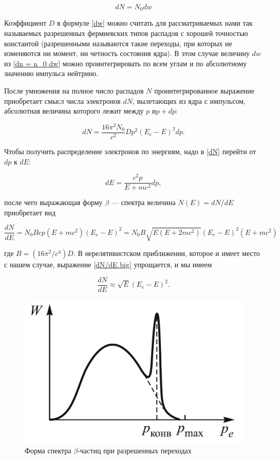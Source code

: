 \documentclass[12pt]{kiarticle} %
\newcommand{\be}{\ensuremath{\beta}}
\begin{document}
\begin{equation}\label{dn = n_0 dw}
dN = N_0 dw  
\end{equation}

Коэффициент $ D $ в формуле \eqref{dw} можно считать для рассматриваемых нами так называемых разрешенных фермиевских типов распадов с хорошей точностью константой (разрешенными называются такие переходы, при которых не изменяются ни момент, ни четность состояния ядра). В этом случае величину $ dw $ из \eqref{dn = n_0 dw} можно проинтегрировать по всем углам и по абсолютному значению импульса нейтрино.

После умножения на полное число распадов $ N $ проинтегрированное выражение приобретает смысл числа электронов $ dN $, вылетающих из ядра с импульсом, абсолютная величина которого лежит между $ p $ и$  p + dp $:

\begin{equation}\label{dN}
dN = \dfrac{16\pi^2 N_0}{c^2}Dp^2(E_e - E)^2dp.
\end{equation}

Чтобы получить распределение электронов по энергиям, надо в \eqref{dN} перейти от $ dp $ к $ dE $:

\begin{equation}
dE = \dfrac{c^2p}{E + mc^2}dp,
\end{equation}

после чего выражающая форму $\beta$ --- спектра величина $ N(E) = dN/dE $
приобретает вид

\begin{equation}\label{dN/dE big}
\dfrac{dN}{dE} = N_0Bcp(E + mc^2)(E_e - E)^2 = N_0B\sqrt{E(E + 2mc^2)}(E_e - E)^2(E + mc^2)
\end{equation}

где $B = (16\pi^2/c^4)D$. В нерелятивистском приближении, которое и имеет место с нашем случае, выражение \eqref{dN/dE big} упрощается, и мы имеем

\begin{equation}\label{dN/dE}
\dfrac{dN}{dE} \approx \sqrt{E}(E_e - E)^2.
\end{equation}

\begin{figure}
	\includegraphics[width=\linewidth]{spektr}
	\caption{Форма спектра \be-частиц
		при разрешенных переходах}
	\label{ris spetr}
\end{figure}
\end{document}
